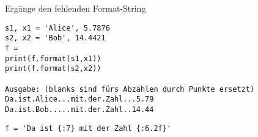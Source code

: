 \question[3] Ergänge den fehlenden Format-String
\begin{lstlisting}
s1, x1 = 'Alice', 5.7876
s2, x2 = 'Bob', 14.4421
f =
print(f.format(s1,x1))
print(f.format(s2,x2))

Ausgabe: (blanks sind fürs Abzählen durch Punkte ersetzt)
Da.ist.Alice...mit.der.Zahl...5.79
Da.ist.Bob.....mit.der.Zahl..14.44
\end{lstlisting}
\begin{solutionbox}{2cm}
\begin{lstlisting}
f = 'Da ist {:7} mit der Zahl {:6.2f}'
\end{lstlisting}
\end{solutionbox}
